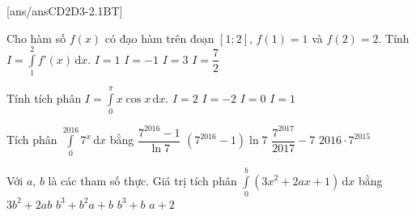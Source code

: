 [ans/ansCD2D3-2.1BT]
\begin{ex}%
	Cho hàm số $f(x)$ có đạo hàm trên đoạn $[1;2]$, $f(1)=1$ và $f(2)=2$. Tính $I=\displaystyle\int\limits_1^2 f’(x)\mathrm{\,d}x$. 
	\choice
	{\True $I=1$}
	{$I=-1$}
	{$I=3$}
	{$I=\dfrac{7}{2}$}
\end{ex}
\begin{ex}%
	Tính tích phân $I=\displaystyle\int\limits_0^{\pi} x\cos x\mathrm{\,d}x$. 
	\choice
	{$I=2$}
	{\True $I=-2$}
	{$I=0$}
	{$I=1$}
\end{ex}
\begin{ex}%
	Tích phân $\displaystyle\int\limits_0^{2016} 7^x\mathrm{\,d}x$ bằng
	\choice
	{\True $\dfrac{7^{2016}-1}{\ln 7}$}
	{$\left(7^{2016}-1\right)\ln 7$}
	{$\dfrac{7^{2017}}{2017}-7$}
	{$2016\cdot 7^{2015}$}
\end{ex}
\begin{ex}%
	Với $a$, $b$ là các tham số thực. Giá trị tích phân $\displaystyle\int\limits_0^b\left(3x^2+2ax+1\right)\mathrm{\,d}x$ bằng
	\choice
	{$3b^2+2ab$}
	{\True $b^3+b^2a+b$}
	{$b^3+b$}
	{$a+2$}
\end{ex}
